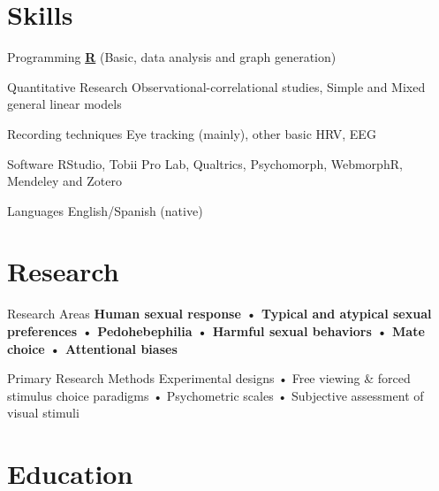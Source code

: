 \documentclass[11pt,a4paper,]{awesome-cv}
\begin{document}
\hypertarget{skills}{%
\section{Skills}\label{skills}}

\begin{cvskills}
  \cvskill
    {Programming}
    {\href{https://www.r-project.org/}{\textbf{R}} (Basic, data analysis and graph generation)}

  \cvskill
    {Quantitative Research}
    {Observational-correlational studies, Simple and Mixed general linear models}
  
  \cvskill
    {Recording techniques}
    {Eye tracking (mainly), other basic HRV, EEG}

  \cvskill
    {Software}
    {RStudio, Tobii Pro Lab, Qualtrics, Psychomorph, WebmorphR, Mendeley and Zotero}

  \cvskill
    {Languages}
    {English/Spanish (native)}
\end{cvskills}

\hypertarget{research}{%
\section{Research}\label{research}}

\begin{cvskills}
  \cvskill
    {Research Areas}
    {\textbf{Human sexual response • Typical and atypical sexual preferences • Pedohebephilia • Harmful sexual \newline behaviors • Mate choice • Attentional biases}}

  \cvskill
    {Primary Research Methods}
    {Experimental designs • Free viewing \& forced stimulus choice paradigms • Psychometric scales • Subjective \newline assessment of visual stimuli}
\end{cvskills}

\hypertarget{education}{%
\section{Education}\label{education}}
\end{document}
